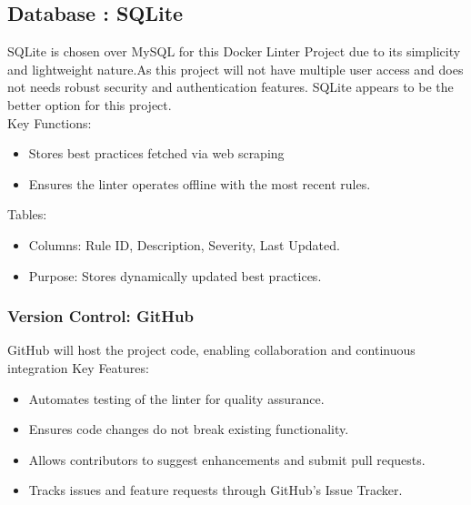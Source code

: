 \subsection{Database : SQLite}
SQLite is chosen over MySQL for this Docker Linter Project due to its simplicity and lightweight nature.\cite{SQLite}As this project will not have multiple user access and does not needs robust security and authentication features. SQLite appears to be the better option for this project. \cite{mysql}
\\Key Functions:
\begin{itemize}
    \item Stores best practices fetched via web scraping
    \item Ensures the linter operates offline with the most recent rules.
\end{itemize}
Tables:
\begin{itemize}
    \item Columns: Rule ID, Description, Severity, Last Updated.
    \item Purpose: Stores dynamically updated best practices.
\end{itemize}
\subsubsection{Version Control: GitHub}
GitHub will host the project code, enabling collaboration and continuous integration
Key Features: 
\begin{itemize}
    \item Automates testing of the linter for quality assurance.
    \item Ensures code changes do not break existing functionality.
    \item Allows contributors to suggest enhancements and submit pull requests. %
    \item Tracks issues and feature requests through GitHub's Issue Tracker.
\end{itemize}


